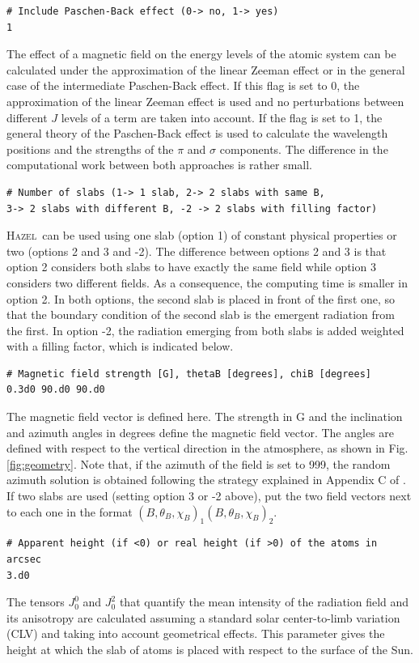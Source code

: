 \documentclass[12pt]{article}
\def\H{\textsc{Hazel}}
\begin{document}
\begin{verbatim}
# Include Paschen-Back effect (0-> no, 1-> yes)
1
\end{verbatim}
The effect of a magnetic field on the energy levels of the atomic system can be calculated
under the approximation of the linear Zeeman effect or in the general case of 
the intermediate Paschen-Back effect. If this flag is set to 0, the approximation of the linear Zeeman 
effect is used and no perturbations between different $J$ levels of a term are taken into
account. If the flag is set to 1, the general theory of the Paschen-Back effect is used to
calculate the wavelength positions and the strengths of the $\pi$ and $\sigma$ components. 
The difference in the computational work between both approaches is rather small.

\begin{verbatim}
# Number of slabs (1-> 1 slab, 2-> 2 slabs with same B, 
3-> 2 slabs with different B, -2 -> 2 slabs with filling factor)
\end{verbatim}
\H\ can be used using one slab (option 1) of constant physical properties or two (options 2 and 3 and -2). The
difference between options 2 and 3 is that option 2 considers both slabs to have exactly the
same field while option 3 considers two different fields. As a consequence, the computing time
is smaller in option 2. In both options, the second slab is placed in front of the first one, so that
the boundary condition of the second slab is the emergent radiation from the first. In option -2, the
radiation emerging from both slabs is added weighted with a filling factor, which is indicated below.

\begin{verbatim}
# Magnetic field strength [G], thetaB [degrees], chiB [degrees]
0.3d0 90.d0 90.d0
\end{verbatim}
The magnetic field vector is defined here. The strength in G and the inclination and
azimuth angles in degrees define the magnetic field vector. The angles are defined with respect to the 
vertical direction in the atmosphere, as shown in Fig. \ref{fig:geometry}. Note that, if
the azimuth of the field is set to 999, the random azimuth solution is obtained following
the strategy explained in Appendix C of \cite{belluzzi07}.
If two slabs are used (setting option 3 or -2 above), put the two field vectors next to each one in the format $(B,\theta_B,\chi_B)_1 (B,\theta_B,\chi_B)_2$.

\begin{verbatim}
# Apparent height (if <0) or real height (if >0) of the atoms in arcsec
3.d0
\end{verbatim}
The tensors $J^0_0$ and $J^2_0$ that quantify the mean intensity of the radiation field and its anisotropy
are calculated assuming a standard solar center-to-limb variation (CLV) and taking into account 
geometrical effects. This parameter
gives the height at which the slab of atoms is placed with respect to the surface of the Sun.
\end{document}
